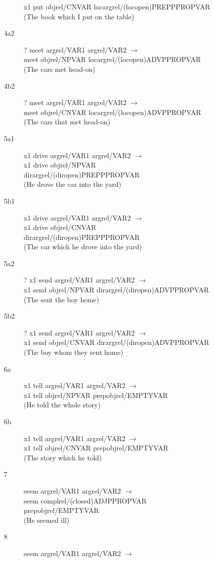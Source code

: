 \begin{description}
\begin{description}
\begin{description}
x1 put objrel/CNVAR locargrel/(locopen)PREPPPROPVAR \\
(The book which I put on the table)
  \item[4a2] ? meet argrel/VAR1 argrel/VAR2 $\rightarrow$ \\
meet objrel/NPVAR locargrel/(locopen)ADVPPROPVAR \\
(The cars met head-on)
  \item[4b2] ? meet argrel/VAR1 argrel/VAR2 $\rightarrow$ \\
meet objrel/CNVAR locargrel/(locopen)ADVPPROPVAR \\
(The cars that met head-on)
  \item[5a1] x1 drive argrel/VAR1 argrel/VAR2 $\rightarrow$ \\
x1 drive objrel/NPVAR dirargrel/(diropen)PREPPPROPVAR \\
(He drove the car into the yard)
  \item[5b1] x1 drive argrel/VAR1 argrel/VAR2 $\rightarrow$ \\
x1 drive objrel/CNVAR dirargrel/(diropen)PREPPPROPVAR \\
(The car which he drove into the yard)
  \item[5a2] ? x1 send argrel/VAR1 argrel/VAR2 $\rightarrow$ \\
x1 send objrel/NPVAR dirargrel/(diropen)ADVPPROPVAR \\
(The sent the boy home)
  \item[5b2] ? x1 send argrel/VAR1 argrel/VAR2 $\rightarrow$ \\
x1 send    objrel/CNVAR dirargrel/(diropen)ADVPPROPVAR \\
(The boy whom they sent home)
  \item[6a] x1 tell argrel/VAR1 argrel/VAR2 $\rightarrow$ \\
x1 tell    objrel/NPVAR prepobjrel/EMPTYVAR \\
(He told the whole story)
  \item[6b] x1 tell argrel/VAR1 argrel/VAR2 $\rightarrow$ \\
x1 tell    objrel/CNVAR prepobjrel/EMPTYVAR \\
(The story which he told)
  \item[7] seem argrel/VAR1 argrel/VAR2 $\rightarrow$ \\
seem    complrel/(closed)ADJPPROPVAR prepobjrel/EMPTYVAR \\
(He seemed ill)
  \item[8] seem argrel/VAR1 argrel/VAR2 $\rightarrow$ \\

\end{description}
\end{description}
\end{description}
